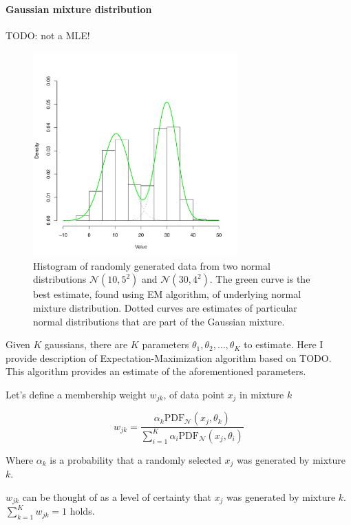 \documentclass[thesis=B,english]{FITthesis}[2012/06/26]
\begin{document}
\paragraph{Gaussian mixture distribution}
TODO: not a MLE!

\begin{figure}
	\centering
 	\includegraphics[width=0.7\textwidth]{gaussian_mixture_estimate}
 	\caption{Histogram of randomly generated data from two normal distributions $\mathcal{N}(10,5^2)$ and $\mathcal{N}(30,4^2)$. The green curve is the best estimate, found using EM algorithm, of underlying normal mixture distribution. Dotted curves are estimates of particular normal distributions that are part of the Gaussian mixture.}
 	\label{fig:gaussian_mixture_est}
\end{figure}

Given $K$ gaussians, there are $K$ parameters $\theta_1, \theta_2, \dots, \theta_K$ to estimate. Here I provide description of Expectation-Maximization algorithm based on TODO. This algorithm provides an estimate of the aforementioned parameters.

Let's define a membership weight $w_{jk}$, of data point $x_j$ in mixture $k$

\begin{equation}
w_{jk} = \frac{\alpha_k \text{PDF}_{\mathcal{N}}(x_j,\theta_k)}{\sum_{i=1}^K \alpha_i \text{PDF}_{\mathcal{N}}(x_j,\theta_i)}
\end{equation}

Where $\alpha_k$ is a probability that a randomly selected $x_j$ was generated by mixture $k$.

$w_{jk}$ can be thought of as a level of certainty that $x_j$ was generated by mixture $k$. $\sum_{k=1}^K w_{jk} = 1$ holds.
\end{document}
